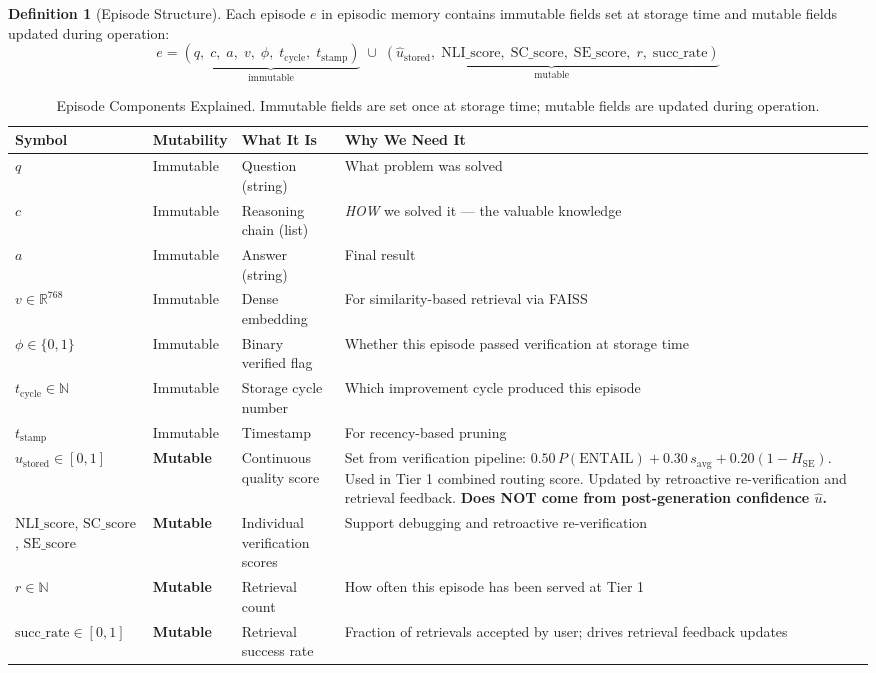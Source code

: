 \documentclass[12pt,a4paper]{article}
\theoremstyle{definition}
\newtheorem{definition}[theorem]{Definition}
\newcommand{\R}{\mathbb{R}}
\newcommand{\uhat}{\hat{u}}
\newcommand{\ustored}{\hat{u}_{\text{stored}}}
\begin{document}
\begin{definition}[Episode Structure]
Each episode $e$ in episodic memory contains immutable fields set at storage time and mutable fields updated during operation:
\begin{equation}
e = \underbrace{(q,\; c,\; a,\; v,\; \phi,\; t_{\text{cycle}},\; t_{\text{stamp}})}_{\text{immutable}} \;\cup\; \underbrace{(\ustored,\; \text{NLI\_score},\; \text{SC\_score},\; \text{SE\_score},\; r,\; \text{succ\_rate})}_{\text{mutable}}
\end{equation}
\end{definition}

\begin{table}[h]
\centering
\caption{Episode Components Explained. Immutable fields are set once at storage time; mutable fields are updated during operation.}
\small
\begin{tabular}{llp{3.5cm}p{5cm}}
\toprule
\textbf{Symbol} & \textbf{Mutability} & \textbf{What It Is} & \textbf{Why We Need It} \\
\midrule
$q$ & Immutable & Question (string) & What problem was solved \\
$c$ & Immutable & Reasoning chain (list) & \textit{HOW} we solved it — the valuable knowledge \\
$a$ & Immutable & Answer (string) & Final result \\
$v \in \R^{768}$ & Immutable & Dense embedding & For similarity-based retrieval via FAISS \\
$\phi \in \{0,1\}$ & Immutable & Binary verified flag & Whether this episode passed verification at storage time \\
$t_{\text{cycle}} \in \mathbb{N}$ & Immutable & Storage cycle number & Which improvement cycle produced this episode \\
$t_{\text{stamp}}$ & Immutable & Timestamp & For recency-based pruning \\
\midrule
$\ustored \in [0,1]$ & \textbf{Mutable} & Continuous quality score & Set from verification pipeline: $0.50\,P(\text{ENTAIL}) + 0.30\,s_{\text{avg}} + 0.20(1{-}H_{\text{SE}})$. Used in Tier 1 combined routing score. Updated by retroactive re-verification and retrieval feedback. \textbf{Does NOT come from post-generation confidence $\uhat$.} \\
$\text{NLI\_score}$, $\text{SC\_score}$, $\text{SE\_score}$ & \textbf{Mutable} & Individual verification scores & Support debugging and retroactive re-verification \\
$r \in \mathbb{N}$ & \textbf{Mutable} & Retrieval count & How often this episode has been served at Tier 1 \\
$\text{succ\_rate} \in [0,1]$ & \textbf{Mutable} & Retrieval success rate & Fraction of retrievals accepted by user; drives retrieval feedback updates \\
\bottomrule
\end{tabular}
\end{table}
\end{document}

